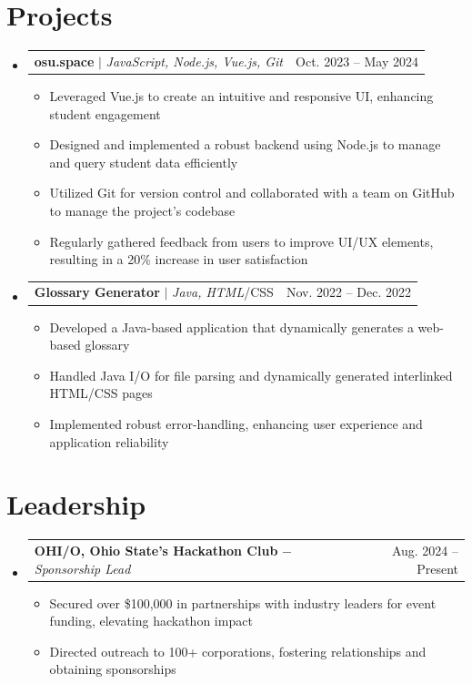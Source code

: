 \documentclass[letterpaper,11pt]{article}
\makeatletter
\newcommand{\resumeItem}[1]{
  \item\small{
    {#1 \vspace{-2pt}}
  }
}
\newcommand{\resumeProjectHeading}[2]{
    \item
    \begin{tabular*}{0.97\textwidth}{l@{\extracolsep{\fill}}r}
      \small#1 & #2 \\
    \end{tabular*}\vspace{-7pt}
}
\newcommand{\resumeSubHeadingListStart}{\begin{itemize}[leftmargin=0.15in, label={}]}
\newcommand{\resumeSubHeadingListEnd}{\end{itemize}}
\newcommand{\resumeItemListStart}{\begin{itemize}}
\newcommand{\resumeItemListEnd}{\end{itemize}\vspace{-5pt}}
\makeatother
\begin{document}
\section{Projects}
    \resumeSubHeadingListStart
      \resumeProjectHeading
          {\textbf{osu.space} $|$ \emph{JavaScript, Node.js, Vue.js, Git}}{Oct. 2023 -- May 2024}
          \resumeItemListStart
            \resumeItem{Leveraged Vue.js to create an intuitive and responsive UI, enhancing student engagement}
            \resumeItem{Designed and implemented a robust backend using Node.js to manage and query student data efficiently}
            \resumeItem{Utilized Git for version control and collaborated with a team on GitHub to manage the project’s codebase}
            \resumeItem{Regularly gathered feedback from users to improve UI/UX elements, resulting in a 20\% increase in user satisfaction}
          \resumeItemListEnd
      \resumeProjectHeading
          {\textbf{Glossary Generator} $|$ \emph{Java, HTML}/CSS}{Nov. 2022 -- Dec. 2022}
          \resumeItemListStart
            \resumeItem{Developed a Java-based application that dynamically generates a web-based glossary}
            \resumeItem{Handled Java I/O for file parsing and dynamically generated interlinked HTML/CSS pages}
            \resumeItem{Implemented robust error-handling, enhancing user experience and application reliability}
          \resumeItemListEnd
    \resumeSubHeadingListEnd

\section{Leadership}
    \resumeSubHeadingListStart
      \resumeProjectHeading
          {\textbf{OHI/O, Ohio State's Hackathon Club} $-$ \emph{Sponsorship Lead}}{Aug. 2024 -- Present}
          \resumeItemListStart
            \resumeItem{Secured over \$100,000 in partnerships with industry leaders for event funding, elevating hackathon impact}
            \resumeItem{Directed outreach to 100+ corporations, fostering relationships and obtaining sponsorships}
          \resumeItemListEnd
    \resumeSubHeadingListEnd

\end{document}
